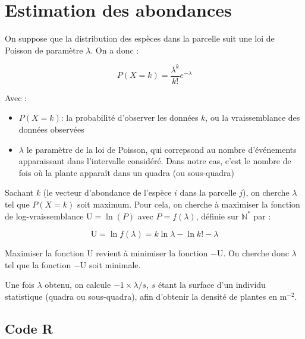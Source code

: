 \documentclass[a4paper, 12pt]{article}
\begin{document}
\section{Estimation des abondances}

On suppose que la distribution des espèces dans la parcelle suit une loi de
Poisson de paramètre $\lambda$.
On a donc :

\[
  P(X = k) = \frac{\lambda^k}{k!} e^{-\lambda}
\]

Avec :
\begin{itemize}
  \item $P(X = k)$: la probabilité d'observer les données $k$, ou la
    vraissemblance des données observées
  \item $\lambda$ le paramètre de la loi de Poisson, qui correpsond au nombre
    d'événements apparaissant dans l'intervalle considéré. Dans notre cas, c'est
    le nombre de fois où la plante apparaît dans un quadra (ou sous-quadra)
\end{itemize}

Sachant $k$ (le vecteur d'abondance de l'espèce $i$ dans la parcelle $j$), on
cherche $\lambda$ tel que $P(X=k)$ soit maximum.
Pour cela, on cherche à maximiser la fonction de log-vraissemblance $\mathrm{U}
= \ln(P)$ avec $ P = f(\lambda)$, définie sur $\mathbb{N}^*$ par :

\[
  \mathrm{U} = \ln f(\lambda) = k\ln \lambda - \ln k! - \lambda
\]

Maximiser la fonction U revient à minimiser la fonction $-\mathrm{U}$.
On cherche donc $\lambda$ tel que la fonction $-\mathrm{U}$ soit minimale.

Une fois $\lambda$ obtenu, on calcule $-1 \times\lambda / s$, $s$ étant la
surface d'un individu statistique (quadra ou sous-quadra), afin d'obtenir la
densité de plantes en $\mathrm{m}^{-2}$.

\subsection{Code R}
\end{document}
